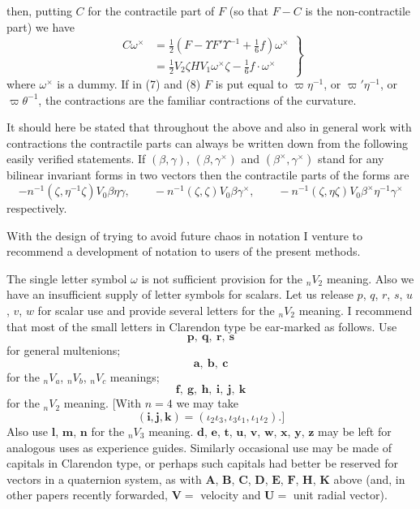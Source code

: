 \documentclass[11pt]{article}
\begin{document}
then, putting $C$ for the contractile part of $F$ (so that $F-C$ is the non-contractile part) we have
\[
  \left.\begin{aligned}
    C\omega^\times&=\tfrac12(F-\Upsilon F'\Upsilon^{-1}+\tfrac16f)\omega^\times\\
      &=\tfrac12V_2\zeta HV_1\omega^\times\zeta-\tfrac16f\mathbin{\cdot}\omega^\times
  \end{aligned}\right\}
  \tag{8}
\]
where $\omega^\times$ is a dummy. If in (7) and (8) $F$ is put equal to $\varpi\eta^{-1}$, or $\varpi'\eta^{-1}$, or $\varpi\theta^{-1}$, the contractions are the familiar contractions of the curvature.

\indent It should here be stated that throughout the above and also in general work with contractions the contractile parts can always be written down from the following easily verified statements. If $(\beta,\gamma)$, $(\beta,\gamma^\times)$ and $(\beta^\times,\gamma^\times)$ stand for any bilinear invariant forms in two vectors then the contractile parts of the forms are
\[
  -n^{-1}(\zeta,\eta^{-1}\zeta)V_0\beta\eta\gamma,\qquad
  -n^{-1}(\zeta,\zeta)V_0\beta\gamma^\times,\qquad
  -n^{-1}(\zeta,\eta\zeta)V_0\beta^\times\eta^{-1}\gamma^\times
\]
respectively.

\indent With the design of trying to avoid future chaos in notation I venture to recommend a development of notation to users of the present methods.

\indent The single letter symbol $\omega$ is not sufficient provision for the ${}_nV_2$ meaning. Also we have an insufficient supply of letter symbols for scalars. Let us release $p$, $q$, $r$, $s$, $u$, $v$, $w$ for scalar use and provide several letters for the ${}_nV_2$ meaning. I recommend that most of the small letters in Clarendon type be ear-marked as follows. Use
\[
  \mathbf{p},\ \mathbf{q},\ \mathbf{r},\ \mathbf{s}
\]
for general multenions;
\[
  \mathbf{a},\ \mathbf{b},\ \mathbf{c}
\]
for the ${}_nV_a$, ${}_nV_b$, ${}_nV_c$ meanings;
\[
  \mathbf{f},\ \mathbf{g},\ \mathbf{h},\ \mathbf{i},\ \mathbf{j},\ \mathbf{k}
\]
for the ${}_nV_2$ meaning. [With $n=4$ we may take
\[
  (\mathbf{i},\mathbf{j},\mathbf{k})=(\iota_2\iota_3,\iota_3\iota_1,\iota_1\iota_2).]
\]
Also use $\mathbf{l}$, $\mathbf{m}$, $\mathbf{n}$ for the ${}_nV_3$ meaning. $\mathbf{d}$, $\mathbf{e}$, $\mathbf{t}$, $\mathbf{u}$, $\mathbf{v}$, $\mathbf{w}$, $\mathbf{x}$, $\mathbf{y}$, $\mathbf{z}$ may be left for analogous uses as experience guides. Similarly occasional use may be made of capitals in Clarendon type, or perhaps such capitals had better be reserved for vectors in a quaternion system, as with $\mathbf{A}$, $\mathbf{B}$, $\mathbf{C}$, $\mathbf{D}$, $\mathbf{E}$, $\mathbf{F}$, $\mathbf{H}$, $\mathbf{K}$ above (and, in other papers recently forwarded, $\mathbf{V}=$ velocity and $\mathbf{U}=$ unit radial vector).
\end{document}
